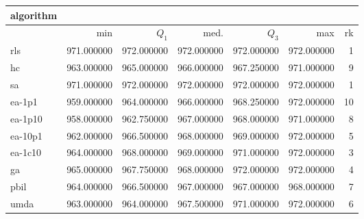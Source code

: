 \begin{tabular}{@{}l*{5}{>{{}}N{3}{0}}>{{}}N{2}{0}@{}}
\toprule
{algorithm} &  \\
\midrule
& {min} & {$Q_1$} & {med.} & {$Q_3$} & {max} & {rk}\\
\midrule
rls & {\color{blue}} 971.000000 & {\color{blue}} 972.000000 & {\color{blue}} 972.000000 & {\color{blue}} 972.000000 & {\color{blue}} 972.000000 & 1\\
hc & 963.000000 & 965.000000 & 966.000000 & 967.250000 & 971.000000 & 9\\
sa & {\color{blue}} 971.000000 & {\color{blue}} 972.000000 & {\color{blue}} 972.000000 & {\color{blue}} 972.000000 & {\color{blue}} 972.000000 & 1\\
ea-1p1 & 959.000000 & 964.000000 & 966.000000 & 968.250000 & {\color{blue}} 972.000000 & 10\\
ea-1p10 & 958.000000 & 962.750000 & 967.000000 & 968.000000 & 971.000000 & 8\\
ea-10p1 & 962.000000 & 966.500000 & 968.000000 & 969.000000 & {\color{blue}} 972.000000 & 5\\
ea-1c10 & 964.000000 & 968.000000 & 969.000000 & 971.000000 & {\color{blue}} 972.000000 & 3\\
ga & 965.000000 & 967.750000 & 968.000000 & {\color{blue}} 972.000000 & {\color{blue}} 972.000000 & 4\\
pbil & 964.000000 & 966.500000 & 967.000000 & 967.000000 & 968.000000 & 7\\
umda & 963.000000 & 964.000000 & 967.500000 & 971.000000 & {\color{blue}} 972.000000 & 6\\
\bottomrule
\end{tabular}
